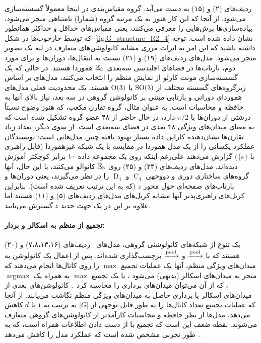 ردیف‌های (۲) و (۱۵)
به دست می‌آید.
گروه مقیاس‌بندی در اینجا معمولاً گسسته‌سازی می‌شود.
از آنجا که این کار هنوز به یک مرتبه گروه (شمارا) نامتناهی منجر می‌شود، پیاده‌سازی‌ها برش‌هایی را معرفی می‌کنند، یعنی مقیاس‌های حداقل و حداکثر همانطور که توسط چارچوب‌ها در شکل~\ref{fig:G_structure_R2_4} نشان داده شده است.
توجه داشته باشید که این امر به اثرات مرزی مشابه کانولوشن‌های متعارف در لبه یک تصویر منجر می‌شود.
%
مدل‌های 
ردیف‌های (۱۹) و (۲۱)
نسبت به انتقال‌ها، دوران‌ها و برای مورد دوم، بازتاب‌ها در فضاهای اقلیدسی سه‌بعدی~$\mathbb{E}_3$ هموردا هستند.
در حالی که \citet{finzi2020generalizing} یک گسسته‌سازی مونت کارلو از نمایش منظم را انتخاب می‌کنند،
مدل‌های \cite{Worrall2018-CUBENET,winkels3DGCNNsPulmonary2018} بر اساس زیرگروه‌های گسسته مختلف از $\operatorname{SO}(3)$ یا $\operatorname{O}(3)$ هستند.
یک محدودیت فعلی مدل‌های هموردای دورانی و بازتابی مبتنی بر کانولوشن گروهی در سه بعد، نیاز بالای آنها به حافظه و محاسبات است.
به عنوان مثال، گروه تقارن مکعب، که هنوز وضوح نسبتاً درشتی از دوران‌ها با $\pi/2$ دارد، در حال حاضر از ۴۸ عضو گروه تشکیل شده است که به معنای میدان‌های ویژگی ۴۸ بعدی در فضای سه‌بعدی است.
از سوی دیگر، تعداد زیاد تقارن‌ها نشان‌دهنده کارایی داده بسیار بهبود یافته چنین مدل‌هایی است:
نویسندگان \cite{winkels3DGCNNsPulmonary2018} عملکرد یکسانی را از یک مدل هموردا در مقایسه با یک شبکه غیرهموردا (قابل راهبری با $\{e\}$) گزارش می‌دهند علی‌رغم اینکه روی یک مجموعه داده ۱۰ برابر کوچکتر آموزش دیده‌اند.
%
مدل‌های 
ردیف‌های (۲۴) و (۲۵)
روی $\mathbb{E}_3$ کانوالو می‌کنند، با این حال، آنها گروه‌های ساختاری دوری و دووجهی $\operatorname{C}_4$ و $\operatorname{D}_4$ را در نظر می‌گیرند، یعنی دوران‌ها و بازتاب‌های صفحه‌ای حول محور $z$ (که به این ترتیب تعریف شده است).
بنابراین کرنل‌های راهبری‌پذیر آنها مشابه کرنل‌های مدل‌های 
ردیف‌های (۵) و (۱۱)
هستند اما علاوه بر این در یک جهت جدید $z$ گسترش می‌یابند.


\paragraph{تجمیع از منظم به اسکالر و بردار:}
یک تنوع از شبکه‌های کانولوشنی گروهی، مدل‌های 
ردیف‌های (۷،۸،۱۳،۱۶) و (۲۰)
هستند که با $\xrightarrow{\textup{pool}}$ و $\xrightarrow{\textup{pool}}$ برچسب‌گذاری شده‌اند.
پس از اعمال یک کانولوشن به میدان‌های ویژگی منظم، آنها یک عملیات \emph{تجمیع} $\operatorname{max}$ را روی کانال‌ها انجام می‌دهند که منجر به میدان‌های اسکالر (بدیهی) می‌شود \cite{Cohen2016-GCNN,marcos2016learning,Weiler2019_E2CNN,ghosh2019scale,andrearczyk2019exploring}، یا یک تجمیع $\operatorname{max}$ به همراه یک $\operatorname{argmax}$، که از آن می‌توان میدان‌های برداری را محاسبه کرد~\cite{Marcos2017-VFN,Weiler2019_E2CNN}.
کانولوشن‌های بعدی از میدان‌های اسکالر یا برداری حاصل به میدان‌های ویژگی منظم نگاشت می‌یابند.
از آنجا که عملیات تجمیع تعداد کانال‌ها را به طور قابل توجهی از $|G|$ به ترتیب به ۱ یا $d$ کاهش می‌دهد، مدل‌ها از نظر حافظه و محاسبات کارآمدتر از کانولوشن‌های گروهی متعارف می‌شوند.
نقطه ضعف این است که تجمیع با از دست دادن اطلاعات همراه است، که به طور تجربی مشخص شده است که عملکرد مدل را کاهش می‌دهد~\cite{Weiler2019_E2CNN}.



